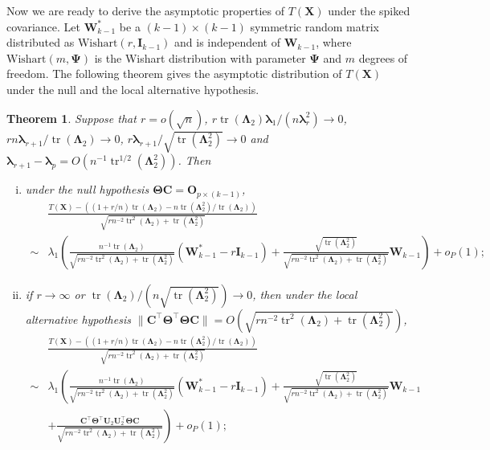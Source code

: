 \documentclass[12pt]{article} %
\DeclareMathOperator{\mytr}{tr}
\newcommand{\bX}{\mathbf{X}}
\newcommand{\bC}{\mathbf{C}}
\newcommand{\bO}{\mathbf{O}}
\newcommand{\bI}{\mathbf{I}}
\newcommand{\bU}{\mathbf{U}}
\newcommand{\bW}{\mathbf{W}}
\newcommand{\bfsym}[1]{\ensuremath{\boldsymbol{#1}}}
\def\blambda {\bfsym {\lambda}}
\def\bLambda {\bfsym {\Lambda}}
\def\bTheta {\bfsym {\Theta}}
\def\bPsi {\bfsym {\Psi}}
\newtheorem{theorem}{Theorem}
\theoremstyle{definition}
\begin{document}
Now we are ready to derive the asymptotic properties of $T(\bX)$ under the spiked covariance.
Let $\bW^*_{k-1}$ be a $(k-1)\times (k-1)$ symmetric random matrix distributed as $\textrm{Wishart}(r,\bI_{k-1})$ and is independent of $\bW_{k-1}$, where $\textrm{Wishart}(m,\bPsi)$ is the Wishart distribution with parameter $\bPsi$ and $m$ degrees of freedom.
The following theorem gives the asymptotic distribution of $T(\bX)$ under the null and the local alternative hypothesis.
\begin{theorem}\label{thm1}
    Suppose that $r=o(\sqrt{n})$, $r\mytr(\bLambda_2)\blambda_1/(n\blambda_r^2)\to 0$, $rn\blambda_{r+1} /\mytr(\bLambda_2)\to 0$,
    $r\blambda_{r+1}/\sqrt{\mytr(\bLambda_2^2)}\to 0$ and $\blambda_{r+1}-\blambda_p=O(n^{-1}\mytr^{1/2}(\bLambda_2^2))$.
    Then
    \begin{enumerate}[(i)]
        \item 
            under the null hypothesis $\bTheta \bC=\bO_{p\times (k-1)}$,
\begin{equation*}
    \begin{split}
&
\frac{
    T(\bX)
    -
    \left((1+r/n)\mytr(\bLambda_2)-n\mytr(\bLambda_2^2)/\mytr(\bLambda_2)\right)
}{
    \sqrt{
        rn^{-2}\mytr^2(\bLambda_2)+ 
        \mytr(\bLambda_2^2)
    }
}
\\
\sim &
\lambda_1
\left(
\frac{
    n^{-1} \mytr(\bLambda_2)
}{
    \sqrt{
        rn^{-2} \mytr^2 (\bLambda_2) + \mytr(\bLambda_2^2)
    }
}
(\bW_{k-1}^* - r\bI_{k-1})
+
\frac{
    \sqrt{\mytr(\bLambda_2^2)}
}{
    \sqrt{
        rn^{-2} \mytr^2 (\bLambda_2) + \mytr(\bLambda_2^2)
    }
}
\bW_{k-1}
\right)
+o_P(1);
    \end{split}
\end{equation*}
        \item
            if $r\to \infty$ or $\mytr(\bLambda_2)/(n \sqrt{\mytr(\bLambda_2^2)})\to 0$, then under the local alternative hypothesis $\|\bC^\top \bTheta^\top \bTheta \bC\|=O(\sqrt{
        rn^{-2} \mytr^2 (\bLambda_2) + \mytr(\bLambda_2^2)
            })$,
\begin{equation*}
    \begin{split}
&
\frac{
    T(\bX)
    -
    \left((1+r/n)\mytr(\bLambda_2)-n\mytr(\bLambda_2^2)/\mytr(\bLambda_2)\right)
}{
    \sqrt{
        rn^{-2}\mytr^2(\bLambda_2)+ 
        \mytr(\bLambda_2^2)
    }
}
\\
\sim &
\lambda_1
\left(
\frac{
    n^{-1} \mytr(\bLambda_2)
}{
    \sqrt{
        rn^{-2} \mytr^2 (\bLambda_2) + \mytr(\bLambda_2^2)
    }
}
(\bW_{k-1}^* - r\bI_{k-1})
+
\frac{
    \sqrt{\mytr(\bLambda_2^2)}
}{
    \sqrt{
        rn^{-2} \mytr^2 (\bLambda_2) + \mytr(\bLambda_2^2)
    }
}
\bW_{k-1}
\right.
\\
&
+\left.
\frac{
    \bC^\top \bTheta^\top \bU_2 \bU_2^\top \bTheta \bC
}{
    \sqrt{
        rn^{-2} \mytr^2 (\bLambda_2) + \mytr(\bLambda_2^2)
    }
}
\right)
+o_P(1);
    \end{split}
\end{equation*}
    \end{enumerate}
\end{theorem}
\end{document}
